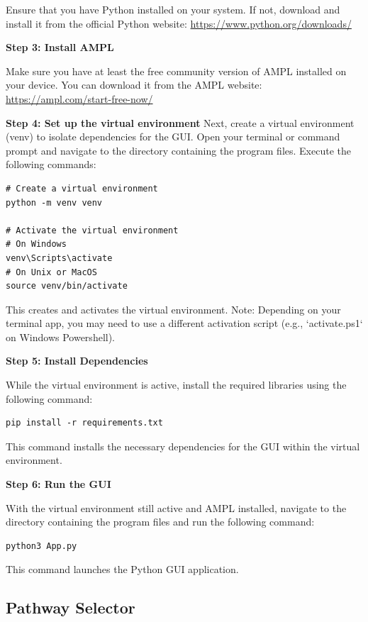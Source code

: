 Ensure that you have Python installed on your system. If not, download and install it from the official Python website: \url{https://www.python.org/downloads/}

\textbf{Step 3: Install AMPL}

Make sure you have at least the free community version of AMPL installed on your device. You can download it from the AMPL website: \url{https://ampl.com/start-free-now/}

\textbf{Step 4: Set up the virtual environment}
Next, create a virtual environment (venv) to isolate dependencies for the GUI. Open your terminal or command prompt and navigate to the directory containing the program files. Execute the following commands:

\begin{verbatim}
# Create a virtual environment
python -m venv venv

# Activate the virtual environment
# On Windows
venv\Scripts\activate
# On Unix or MacOS
source venv/bin/activate
\end{verbatim}

This creates and activates the virtual environment. Note: Depending on your terminal app, you may need to use a different activation script (e.g., `activate.ps1` on Windows Powershell).

\textbf{Step 5: Install Dependencies}

While the virtual environment is active, install the required libraries using the following command:

\begin{verbatim}
pip install -r requirements.txt
\end{verbatim}

This command installs the necessary dependencies for the GUI within the virtual environment.


\textbf{Step 6: Run the GUI}

With the virtual environment still active and AMPL installed, navigate to the directory containing the program files and run the following command:

\begin{verbatim}
python3 App.py
\end{verbatim}

This command launches the Python GUI application.

\subsection{Pathway Selector} \label{sec:pathway_selector}

